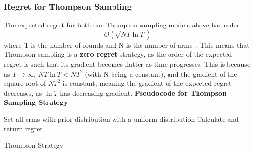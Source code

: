     \subsubsection{Regret for Thompson Sampling}
    The expected regret for both our Thompson sampling models above has order
    $$O(\sqrt{NT\ln{T}})$$
    where T is the number of rounds and N is the number of arms~\citep{agrawal2013further}. This means that Thompson sampling is a \textbf{zero regret} strategy, as the order of the expected regret is such that its gradient becomes flatter as time progresses. This is because as $T\to\infty$, $NT\ln{T} < NT^2$ (with N being a constant), and the gradient of the square root of $NT^2$ is constant, meaning the gradient of the expected regret decreases, as $\ln{T}$ has decreasing gradient.
    \newline
    \textbf{Pseudocode for Thompson Sampling Strategy}
    \newline
    \begin{algorithm}[H]
        Set all arms with prior distribution with a uniform distribution\;
        Calculate and return regret
        \caption{Thompson Strategy}\label{alg:thompson_algorithm}
    \end{algorithm}